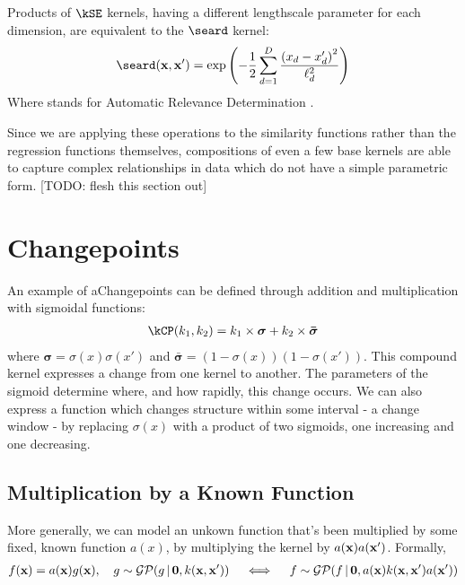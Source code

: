 Products of $\kSE$ kernels, having a different lengthscale parameter for each dimension, are equivalent to the $\seard$ kernel:
%
\begin{align}
\seard( \vx, \vx') = \exp \left( -\frac{1}{2} \sum_{d=1}^D \frac{\left( x_d - x'_d \right)^2}{\ell_d^2} \right)
\end{align}
%
Where \ARD{} stands for Automatic Relevance Determination .

Since we are applying these operations to the similarity functions rather than the regression functions themselves, compositions of even a few base kernels are able to capture complex relationships in data which do not have a simple parametric form.
[TODO: flesh this section out]





\section{Changepoints}
An example of aChangepoints can be defined through addition and multiplication with sigmoidal functions:
%
\begin{align}
\kCP(\kernel_1, \kernel_2) = \kernel_1 \times \boldsymbol\sigma + \kernel_2 \times \boldsymbol{\bar\sigma}
\label{eq:cp}
\end{align}
where $\boldsymbol\sigma = \sigma(x)\sigma(x')$ and $\boldsymbol{\bar\sigma} = (1-\sigma(x))(1-\sigma(x'))$.
%
This compound kernel expresses a change from one kernel to another.
The parameters of the sigmoid determine where, and how rapidly, this change occurs.
We can also express a function which changes structure within some interval - a change window - by replacing $\sigma(x)$ with a product of two sigmoids, one increasing and one decreasing.

\subsection{Multiplication by a Known Function}

More generally, we can model an unkown function that's been multiplied by some fixed, known function $a(x)$, by multiplying the kernel by $a({\bf{x}}) a({\bf{x}}')$.
Formally,
%
\begin{align}
f({\bf{x}}) = a({\bf{x}}) g({\bf{x}}), \quad g \sim \mathcal{GP}\!\left(g \, \middle| \, {\bf{0}}, k({\bf{x}}, {\bf{x}}') \right) \quad
\iff
\quad f \sim \mathcal{GP}\!\left(f \, \middle| \, {\bf{0}},  a({\bf{x}}) k({\bf{x}}, {\bf{x}}') a({\bf{x}}') \right)
\end{align}




